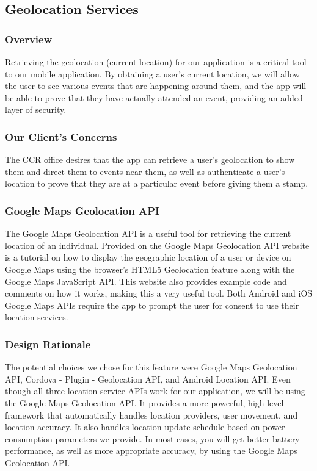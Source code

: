 \documentclass[draftclsnofoot, onecolumn, 10pt, compsoc]{IEEEtran}
\begin{document}
		\subsection{Geolocation Services}
			\subsubsection{Overview}
				Retrieving the geolocation (current location) for our application is a critical tool to our mobile application. By obtaining a user's current location, we will allow the user to see various events that are happening around them, and the app will be able to prove that they have actually attended an event, providing an added layer of security. 
			\subsubsection{Our Client's Concerns}
				The CCR office desires that the app can retrieve a user's geolocation to show them and direct them to events near them, as well as authenticate a user's location to prove that they are at a particular event before giving them a stamp.
			\subsubsection{Google Maps Geolocation API}
				The Google Maps Geolocation API is a useful tool for retrieving the current location of an individual. Provided on the Google Maps Geolocation API website is a tutorial on how to display the geographic location of a user or device on Google Maps using the browser's HTML5 Geolocation feature along with the Google Maps JavaScript API. This website also provides example code and comments on how it works, making this a very useful tool. Both Android and iOS Google Maps APIs require the app to prompt the user for consent to use their location services.
				~\cite{GMaps}
			\subsubsection{Design Rationale}
				The potential choices we chose for this feature were Google Maps Geolocation API, Cordova - Plugin - Geolocation API, and Android Location API. Even though all three location service APIs work for our application, we will be using the Google Maps Geolocation API. It provides a more powerful, high-level framework that automatically handles location providers, user movement, and location accuracy. It also handles location update schedule based on power consumption parameters we provide. In most cases, you will get better battery performance, as well as more appropriate accuracy, by using the Google Maps Geolocation API.
				~\cite{GMaps}
\end{document}

